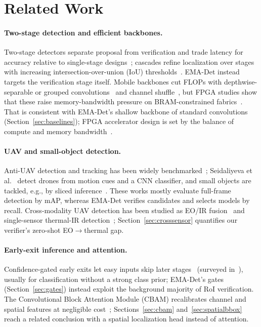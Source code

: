 \documentclass[pdflatex,sn-mathphys-num,iicol]{sn-jnl}%
\begin{document}
\section{Related Work}\label{sec:related}

 \paragraph{Two-stage detection and efficient backbones.} Two-stage
detectors separate proposal from verification and trade latency for
accuracy relative to single-stage designs~\cite{ren2015faster}; cascades
refine localization over stages with increasing intersection-over-union
(IoU) thresholds~\cite{cai2018cascade}. EMA-Det instead targets
the verification stage itself. Mobile backbones cut FLOPs with
depthwise-separable or grouped convolutions~\cite{howard2019mobilenetv3}
and channel shuffle~\cite{ma2018shufflenet}, but FPGA studies show that
these raise memory-bandwidth pressure on BRAM-constrained
fabrics~\cite{zhao2024fpga}. That is consistent with EMA-Det's shallow
backbone of standard convolutions (Section~\ref{sec:baselines}); FPGA accelerator
design is set by the balance of compute and memory bandwidth~\cite{zhang2015fpga}.

 \paragraph{UAV and small-object detection.} Anti-UAV
detection and tracking has been widely
benchmarked~\cite{zhao2022antiuav,jiang2021antiuav,zhu2021visdrone};
Seidaliyeva et al.~\cite{seidaliyeva2020drone} detect drones from motion cues and a
CNN classifier, and small objects are tackled, e.g., by sliced
inference~\cite{akyon2022sahi}. These works mostly evaluate full-frame detection by
mAP, whereas EMA-Det verifies candidates and selects models by recall.
Cross-modality UAV detection has been studied as EO/IR
fusion~\cite{sun2022dronevehicle} and single-sensor thermal-IR
detection~\cite{antiuav410}; Section~\ref{sec:crosssensor} quantifies our verifier's
zero-shot EO$\to$thermal gap.

 \paragraph{Early-exit inference and attention.} Confidence-gated early exits let
easy inputs skip later stages~\cite{teerapittayanon2016branchynet,liang2024implementation}
(surveyed in~\cite{rahmath2024earlyexit}), usually for classification without a
strong class prior; EMA-Det's gates (Section~\ref{sec:gates}) instead exploit the
background majority of RoI verification. The Convolutional Block Attention Module
(CBAM) recalibrates channel and spatial features at negligible
cost~\cite{woo2018cbam}; Sections~\ref{sec:cbam} and~\ref{sec:spatialbbox}
reach a related conclusion with a spatial localization head instead of attention.
\end{document}
